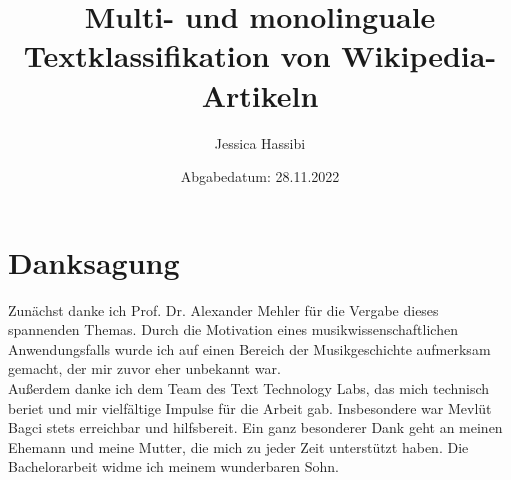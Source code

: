 \documentclass[ngerman]{ttlab-qualify}
\begin{document}
\titlehead{
  Jessica Hassibi\\
  6377520\\
  Bachelor (PO 2011)\\
  Informatik / Anwendungsfach Musik\\
  8. Semester\\
  s6653550@stud.uni-frankfurt.de  
}

\subject{Bachelorarbeit}
\author{Jessica Hassibi}
\title{Multi- und monolinguale Textklassifikation von Wikipedia-Artikeln}
\date{Abgabedatum: 28.11.2022}
\publishers{Text Technology Lab\\Betreuer: Prof. Dr. Alexander Mehler}

\maketitle

\chapter*{\centering Danksagung}
Zunächst danke ich Prof. Dr. Alexander Mehler für die Vergabe dieses spannenden Themas. Durch die Motivation eines musikwissenschaftlichen Anwendungsfalls wurde ich auf einen Bereich der Musikgeschichte aufmerksam gemacht, der mir zuvor eher unbekannt war. \\
Außerdem danke ich dem Team des Text Technology Labs, das mich technisch beriet und mir vielfältige Impulse für die Arbeit gab.
Insbesondere war Mevlüt Bagci stets erreichbar und hilfsbereit.
Ein ganz besonderer Dank geht an meinen Ehemann und meine Mutter, die mich zu jeder Zeit unterstützt haben. Die Bachelorarbeit widme ich meinem wunderbaren Sohn.
\end{document}
